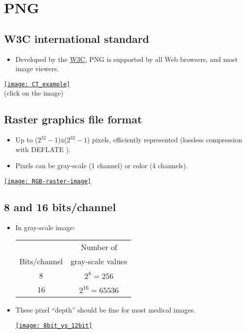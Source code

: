 \chapter{\gls{PNG}}

\section{\gls{W3C} international standard}
\begin{itemize}
\item Developed by the \href{https://www.w3.org/}{W3C}, \gls{PNG} \cite{roelofs1999png} is
  supported by all Web browsers, and most image viewers.
\end{itemize}
\begin{center}
  \href{https://upload.wikimedia.org/wikipedia/commons/0/05/CT_of_a_normal_abdomen_and_pelvis%2C_coronal_plane_79.png}{\texttt{[image: CT\_example]}}\\
     (click on the image)
\end{center}

\section{Raster graphics file format}
\begin{itemize}
\item Up to ($2^{32}-1$)x($2^{32}-1$) pixels, efficiently represented
  (lossless compression with DEFLATE \cite{deutsch1996deflate}).
\item Pixels can be gray-scale (1 channel) or color
   (4 channels).
\end{itemize}
\vspace{-4ex}
\begin{center}
  \href{https://en.wikipedia.org/wiki/Raster_graphics}{\texttt{[image: RGB-raster-image]}}
\end{center}

\section{8 and 16 bits/channel}
\begin{itemize}
\item In gray-scale image:
  \begin{center}
    \begin{tabular}{c|c}
      & Number of \\
      Bits/channel & gray-scale values \\
      \hline
      8 & $2^8=256$ \\
      16 & $2^{16}=65536$
    \end{tabular}
  \end{center}
\item These pixel ``depth'' should be fine for most medical images.
  \begin{center}
    \href{https://www.fastcompression.com/blog/jpeg2000-applications-part1.htm}{\texttt{[image: 8bit\_vs\_12bit]}}
  \end{center}
\end{itemize}

